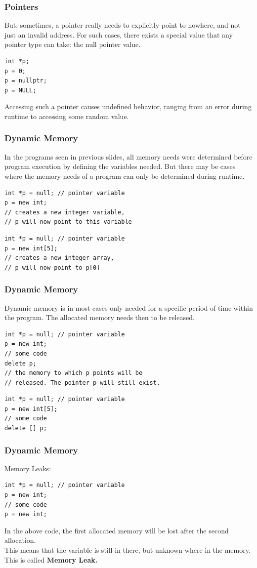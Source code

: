 \begin{frame}[fragile]
\frametitle{Pointers}
But, sometimes, a pointer really needs to explicitly point to nowhere, and not just an invalid address.
For such cases, there exists a special value that any pointer type can take:
the null pointer value.
{\tiny
\begin{lstlisting}
int *p;
p = 0;
p = nullptr;
p = NULL;
\end{lstlisting}
}
Accessing such a pointer causes undefined behavior,
ranging from an error during runtime to accessing some random value.
\end{frame}

\begin{frame}[fragile]
\frametitle{Dynamic Memory}
In the programs seen in previous slides, all memory needs were determined
before program execution by defining the variables needed.
But there may be cases where the memory needs of a program can only be determined during runtime.

\begin{lstlisting}
int *p = null; // pointer variable
p = new int;
// creates a new integer variable,
// p will now point to this variable
\end{lstlisting}

\begin{lstlisting}
int *p = null; // pointer variable
p = new int[5];
// creates a new integer array,
// p will now point to p[0]
\end{lstlisting}

\end{frame}

\begin{frame}[fragile]
\frametitle{Dynamic Memory}
Dynamic memory is in most cases only needed for a specific period of time within
the program. The allocated memory needs then to be released.

\begin{lstlisting}
int *p = null; // pointer variable
p = new int;
// some code
delete p;
// the memory to which p points will be
// released. The pointer p will still exist.
\end{lstlisting}
\end{frame}

\begin{lstlisting}
int *p = null; // pointer variable
p = new int[5];
// some code
delete [] p;
\end{lstlisting}

\begin{frame}[fragile]
\frametitle{Dynamic Memory}
Memory Leaks:

\begin{lstlisting}
int *p = null; // pointer variable
p = new int;
// some code
p = new int;
\end{lstlisting}
In the above code, the first allocated memory will be lost
after the second allocation.\\
This means that the variable is still in there, but unknown where
in the memory. This is called \bf{Memory Leak}.

\end{frame}

